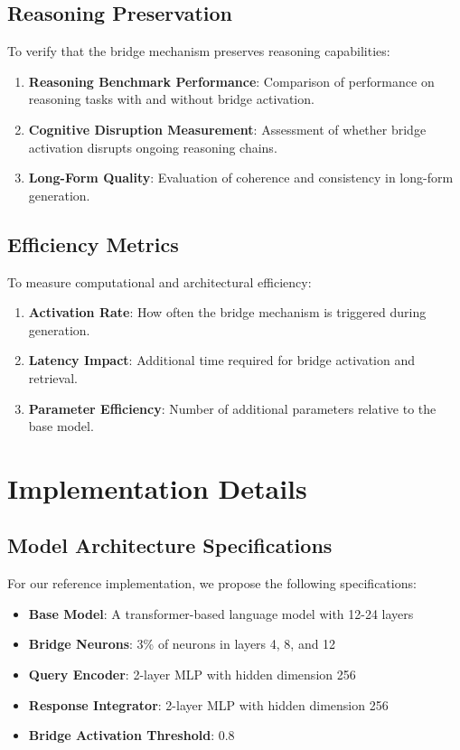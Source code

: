 \documentclass[9pt,a4paper,twocolumn,twoside]{tau-class/tau}
\begin{document}
\subsection{Reasoning Preservation}

    To verify that the bridge mechanism preserves reasoning capabilities:

    \begin{enumerate}
        \item \textbf{Reasoning Benchmark Performance}: Comparison of performance on reasoning tasks with and without bridge activation.
        \item \textbf{Cognitive Disruption Measurement}: Assessment of whether bridge activation disrupts ongoing reasoning chains.
        \item \textbf{Long-Form Quality}: Evaluation of coherence and consistency in long-form generation.
    \end{enumerate}

\subsection{Efficiency Metrics}

    To measure computational and architectural efficiency:

    \begin{enumerate}
        \item \textbf{Activation Rate}: How often the bridge mechanism is triggered during generation.
        \item \textbf{Latency Impact}: Additional time required for bridge activation and retrieval.
        \item \textbf{Parameter Efficiency}: Number of additional parameters relative to the base model.
    \end{enumerate}

\section{Implementation Details}

\subsection{Model Architecture Specifications}

    For our reference implementation, we propose the following specifications:

    \begin{itemize}
        \item \textbf{Base Model}: A transformer-based language model with 12-24 layers
        \item \textbf{Bridge Neurons}: 3\% of neurons in layers 4, 8, and 12
        \item \textbf{Query Encoder}: 2-layer MLP with hidden dimension 256
        \item \textbf{Response Integrator}: 2-layer MLP with hidden dimension 256
        \item \textbf{Bridge Activation Threshold}: 0.8
    \end{itemize}
\end{document}
